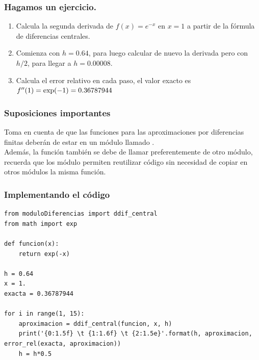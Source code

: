 \documentclass[12pt]{beamer}
\begin{document}
\begin{frame}
\frametitle{Hagamos un ejercicio.}
\begin{enumerate}[<+->]
\item Calcula la segunda derivada de $f (x) = e^{-x}$ en $x = 1$ a partir de la fórmula de diferencias centrales.
\item Comienza con $h = 0.64$, para luego calcular de nuevo la derivada pero con $h /2$, para llegar a $h = 0.00008$.
\item Calcula el error relativo en cada paso, el valor exacto es ${f}^{\prime \prime} (1) = \exp(-1) = 0.36787944$
\end{enumerate}
\end{frame}
\begin{frame}
\frametitle{Suposiciones importantes}
Toma en cuenta de que las funciones para las aproximaciones por diferencias finitas deberán de estar en un módulo llamado .
\\
\bigskip
\pause
Además, la función  también se debe de llamar preferentemente de otro módulo, recuerda que los módulo permiten reutilizar código sin necesidad de copiar en otros módulos la misma función.
\end{frame}
\begin{frame}
\frametitle{Implementando el código}
\begin{lstlisting}[caption=Código para obtener la aproximación de la segunda derivada]
from moduloDiferencias import ddif_central
from math import exp

def funcion(x):
    return exp(-x)

h = 0.64
x = 1.
exacta = 0.36787944

for i in range(1, 15):
    aproximacion = ddif_central(funcion, x, h)
    print('{0:1.5f} \t {1:1.6f} \t {2:1.5e}'.format(h, aproximacion, error_rel(exacta, aproximacion))
    h = h*0.5
\end{lstlisting}
\end{frame}
\end{document}
